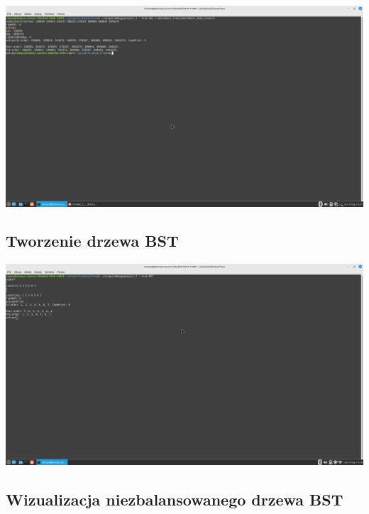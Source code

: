 \documentclass[12pt]{article}
\begin{document}
\begin{center}

\includegraphics[scale=0.25]{createAVL.png}

\end{center}

\subsection{Tworzenie drzewa BST}

\begin{center}

\includegraphics[scale=0.25]{createBSTNonBalanced_0.png}

\end{center}

\subsection{Wizualizacja niezbalansowanego drzewa BST}
\end{document}
